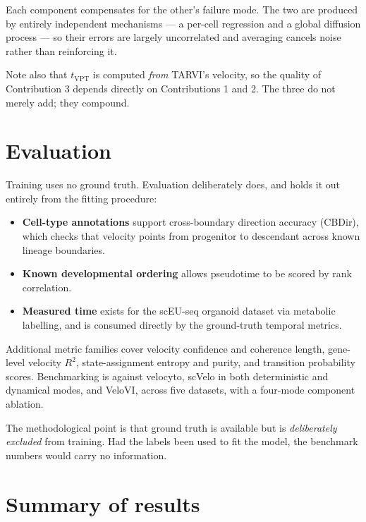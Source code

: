 \documentclass[11pt,a4paper]{article}
\newenvironment{keybox}{\begin{shaded}\noindent}{\end{shaded}}
\theoremstyle{definition}
\begin{document}
Each component compensates for the other's failure mode. The two are produced
by entirely independent mechanisms --- a per-cell regression and a global
diffusion process --- so their errors are largely uncorrelated and averaging
cancels noise rather than reinforcing it.

Note also that $t_{\text{VPT}}$ is computed \emph{from} TARVI's velocity, so
the quality of Contribution 3 depends directly on Contributions 1 and 2. The
three do not merely add; they compound.

\section{Evaluation}

Training uses no ground truth. Evaluation deliberately does, and holds it out
entirely from the fitting procedure:

\begin{itemize}[leftmargin=*]
\item \textbf{Cell-type annotations} support cross-boundary direction accuracy
      (CBDir), which checks that velocity points from progenitor to descendant
      across known lineage boundaries.
\item \textbf{Known developmental ordering} allows pseudotime to be scored by
      rank correlation.
\item \textbf{Measured time} exists for the scEU-seq organoid dataset via
      metabolic labelling, and is consumed directly by the ground-truth
      temporal metrics.
\end{itemize}

Additional metric families cover velocity confidence and coherence length,
gene-level velocity $R^2$, state-assignment entropy and purity, and transition
probability scores. Benchmarking is against velocyto, scVelo in both
deterministic and dynamical modes, and VeloVI, across five datasets, with a
four-mode component ablation.

\begin{keybox}
The methodological point is that ground truth is available but is
\emph{deliberately excluded} from training. Had the labels been used to fit the
model, the benchmark numbers would carry no information.
\end{keybox}

\section*{Summary of results}
\end{document}
